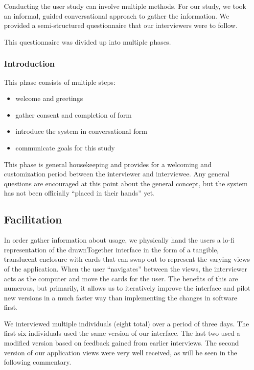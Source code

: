 \documentclass{chi2009}
\begin{document}
Conducting the user study can involve multiple methods.  For our study, we took
an informal, guided conversational approach to gather the information.  We
provided a semi-structured questionnaire that our interviewers were to follow.

This questionnaire was divided up into multiple phases.

\subsubsection{ Introduction }

This phase consists of multiple steps:
\begin{itemize}
\item welcome and greetings
\item gather consent and completion of form
\item introduce the system in conversational form
\item communicate goals for this study
\end{itemize}

This phase is general housekeeping and provides for a welcoming and
customization period between the interviewer and interviewee.  Any general
questions are encouraged at this point about the general concept, but the
system has not been officially ``placed in their hands'' yet.

\subsection{Facilitation}

In order gather information about usage, we physically hand the users a
lo-fi representation of the drawnTogether interface in the form of a tangible,
translucent enclosure with cards that can swap out to represent the varying
views of the application.  When the user ``navigates'' between the views, the
interviewer acts as the computer and move the cards for the user.  The
benefits of this are numerous, but primarily, it allows us to iteratively
improve the interface and pilot new versions in a much faster way than
implementing the changes in software first.

We interviewed multiple individuals (eight total) over a period of three days.
The first six individuals used the same version of our interface.  The last two
used a modified version based on feedback gained from earlier interviews.  The
second version of our application views were very well received, as will be
seen in the following commentary.
\end{document}
